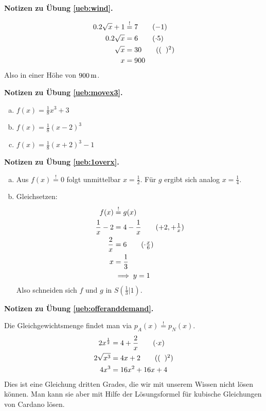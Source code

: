 \documentclass[%
11pt,%
twoside,%
titlepage,%
swissgerman,%
headsepline%
]{scrartcl}
\newcommand{\faReturnGray}{\textcolor{gray}{\faMailReply}} %
\theoremstyle{definition}
\theoremstyle{plain}
\newcommand{\concatueb}[1]{ueb:#1}%
\newcommand{\concatlsg}[1]{lsg:#1}%
\newenvironment{lsg}[1]{%
    \par\noindent\textbf{Notizen zu Übung \ref{\concatueb{#1}}.}%
    \label{\concatlsg{#1}} %
    \hfill\hyperref[\concatueb{#1}]{\faReturnGray}\par %
}{%
    \par%
}
\begin{document}
\begin{lsg}{wind}
  \begin{align*}
    0.2\sqrt{x}+1 &\stackrel{!}{=} 7\tag{$-1$}\\
    0.2\sqrt{x} &= 6\tag{$\cdot5$}\\
    \sqrt{x} &= 30\tag{$(\phantom{x})^2$}\\
    x &= 900
  \end{align*}
  Also in einer Höhe von $\unit[900]{m}$.
\end{lsg}

\begin{lsg}{movex3}
  \begin{enumerate}[a)]
    \item $f(x)=\frac{1}{8}x^3+3$
    \item $f(x)=\frac{1}{8}(x-2)^3$
    \item $f(x)=\frac{1}{8}(x+2)^3-1$
  \end{enumerate}
\end{lsg}

\begin{lsg}{1overx}
  \begin{enumerate}[a)]
    \item Aus $f(x)\stackrel{!}{=}0$ folgt unmittelbar $x=\frac{1}{2}$. Für $g$ ergibt sich analog $x=\frac{1}{4}$.
    \item Gleichsetzen:
    \begin{align*}
      f(x)&\stackrel{!}{=} g(x)\\
      \frac{1}{x}-2 &= 4-\frac{1}{x}\tag{$+2,+\frac{1}{x}$}\\
      \frac{2}{x} &= 6\tag{$\cdot\frac{x}{6}$}\\
      x &= \frac{1}{3}\\
      &\implies y=1
    \end{align*}
    Also schneiden sich $f$ und $g$ in $S(\frac{1}{3}|1)$.
  \end{enumerate}
\end{lsg}

\begin{lsg}{offeranddemand}
  Die Gleichgewichtsmenge findet man via $p_A(x)\stackrel{!}{=} p_N(x)$.
    \begin{align*}
      2x^\frac{1}{2} &= 4+\frac{2}{x}\tag{$\cdot x$}\\
      2\sqrt{x^3} &= 4x + 2\tag{$(\phantom{x})^2$}\\
      4x^3 &= 16x^2 +16x + 4
    \end{align*}
  Dies ist eine Gleichung dritten Grades, die wir mit unserem Wissen nicht lösen können. Man kann sie aber mit Hilfe der Lösungsformel für kubische Gleichungen von Cardano lösen.
\end{lsg}
\end{document}
